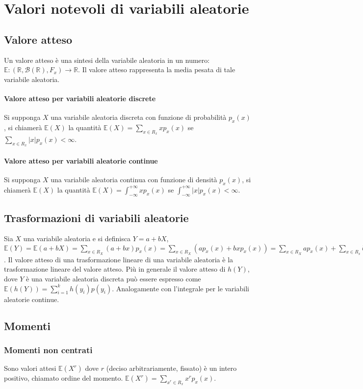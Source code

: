 \chapter{Valori notevoli di variabili aleatorie}
\section{Valore atteso}
Un valore atteso \`e una sintesi della variabile aleatoria in un numero: $\mathbb{E}:(\mathbb{R}, \mathcal{B}(\mathbb{R}), F_x)\rightarrow\mathbb{R}$. Il valore atteso 
rappresenta la media pesata di tale variabile aleatoria.
\subsubsection{Valore atteso per variabili aleatorie discrete}
Si supponga $X$ una variabile aleatoria discreta con funzione di probabilit\`a $p_x(x)$, si chiamer\`a $\mathbb{E}(X)$ la quantit\`a $\mathbb{E}(X)=\sum\limits_{x\in R_x}
xp_x(x)$ se $\sum\limits_{x\in R_x}|x|p_x(x)<\infty$.
\subsubsection{Valore atteso per variabili aleatorie continue}
Si supponga $X$ una variabile aleatoria continua con funzione di densit\`a $p_x(x)$, si chiamer\`a $\mathbb{E}(X)$ la quantit\`a $\mathbb{E}(X)=\int_{-\infty}^{+\infty}xp_x(x)$ 
se $\int_{-\infty}^{+\infty}|x|p_x(x)<\infty$.
\section{Trasformazioni di variabili aleatorie}
Sia $X$ una variabile aleatoria e si definisca $Y=a+bX$, $\mathbb{E}(Y)=\mathbb{E}(a+bX)=\sum\limits_{x\in R_X}(a+bx)p_x(x)=\sum\limits_{x\in R_X}(ap_x(x)+bxp_x(x))=\sum
\limits_{x\in R_X}ap_x(x)+\sum\limits_{x\in R_x}bxp_x(x)=a\sum\limits_{x\in R_X}p_x(x)+b\sum\limits_{x\in R_x}xp_x(x)=a+b\mathbb{E}(X)$. Il valore atteso di una trasformazione 
lineare di una variabile aleatoria \`e la trasformazione lineare del valore atteso. Pi\`u in generale il valore atteso di $h(Y)$, dove $Y$ \`e una variabile aleatoria discreta 
pu\`o essere espresso come $\mathbb{E}(h(Y))=\sum\limits_{i=1}^kh(y_i)p(y_i)$. Analogamente con l'integrale per le variabili aleatorie continue.
\section{Momenti}
\subsection{Momenti non centrati}
Sono valori attesi $\mathbb{E}(X^r)$ dove $r$ (deciso arbitrariamente, fissato) \`e un intero positivo, chiamato ordine del momento. $\mathbb{E}(X^r)=\sum\limits_{x^r\in R_x}
x^rp_x(x)$.
